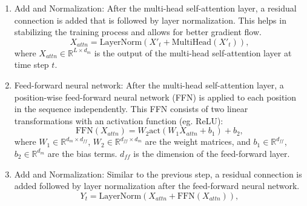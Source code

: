 \begin{enumerate}
\begin{equation}
        \text{Attention}(Q, K, V) = \text{softmax}\left(\frac{QK^T}{\sqrt{d_k}}\right)V,
    \end{equation}
    where $d_k$ is the dimension of the key vectors. The term multi-head attention implies that the process is repeated multiple times (heads) with different learned weight matrices, allowing the model to capture various aspects of the input sequence. The outputs of each head are then concatenated and transformed using another learned weight matrix ($W_O$):
    \begin{equation}
        \text{head}_i = \text{Attention}(X_t'W_{Q_i}, X_t'W_{K_i}, X_t'W_{V_i}),
    \end{equation}
    \begin{equation}
        \text{MultiHead}(Q, K, V) = \text{Concat}(\text{head}_1, \text{head}_2, ..., \text{head}_h)W_O,
    \end{equation}
    where $h$ is the number of attention heads.
    \item Add and Normalization: After the multi-head self-attention layer, a residual connection is added that is followed by layer normalization. This helps in stabilizing the training process and allows for better gradient flow. 
    \begin{equation}
        X_{attn} = \text{LayerNorm}(X'_t + \text{MultiHead}(X'_t)),
    \end{equation}
    where $X_{attn} \in \mathbb{R}^{L \times d_m}$ is the output of the multi-head self-attention layer at time step $t$.
    \item Feed-forward neural network: After the multi-head self-attention layer, a position-wise feed-forward neural network (FFN) is applied to each position in the sequence independently. This FFN consists of two linear transformations with an activation function (eg. ReLU):
    \begin{equation}
        \text{FFN}(X_{attn}) = W_2\text{act}(W_1X_{attn} + b_1) + b_2,
    \end{equation}
    where $W_1 \in \mathbb{R}^{d_m \times d_{ff}}$, $W_2 \in \mathbb{R}^{d_{ff} \times d_m}$ are the weight matrices, and $b_1 \in \mathbb{R}^{d_{ff}}$, $b_2 \in \mathbb{R}^{d_m}$ are the bias terms. $d_{ff}$ is the dimension of the feed-forward layer.
    \item Add and Normalization: Similar to the previous step, a residual connection is added followed by layer normalization after the feed-forward neural network.
    \begin{equation}
        Y_{t} = \text{LayerNorm}(X_{attn} + \text{FFN}(X_{attn})),

\end{equation}
\end{enumerate}
